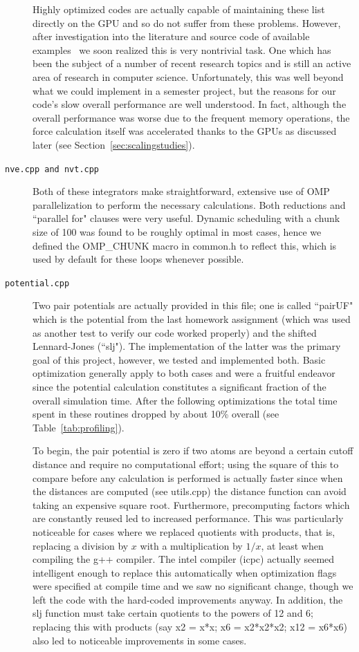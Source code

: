 \documentclass[12pt]{article}
\begin{document}
\begin{description}
Highly optimized codes are actually capable of maintaining these list directly on the GPU and so do not suffer from these problems.  However, after investigation into the literature and source code of available examples~\cite{Anderson2008, Lipscomb2012} we soon realized this is very nontrivial task. One which has been the subject of a number of recent research topics and is still an active area of research in computer science.  Unfortunately, this was well beyond what we could implement in a semester project, but the reasons for our code's slow overall performance are well understood.  In fact, although the overall performance was worse due to the frequent memory operations, the force calculation itself was accelerated thanks to the GPUs as discussed later (see Section~\ref{sec:scalingstudies}).

\item[\texttt{nve.cpp and nvt.cpp}] 
Both of these integrators make straightforward, extensive use of OMP parallelization to perform the necessary calculations.  Both reductions and ``parallel for" clauses were very useful.  Dynamic scheduling with a chunk size of 100 was found to be roughly optimal in most cases, hence we defined the OMP\_CHUNK macro in common.h to reflect this, which is used by default for these loops whenever possible.

\item[\texttt{potential.cpp}] 
Two pair potentials are actually provided in this file; one is called ``pairUF" which is the potential from the last homework assignment (which was used as another test to verify our code worked properly) and the shifted Lennard-Jones (``slj").  The implementation of the latter was the primary goal of this project, however, we tested and implemented both.  Basic optimization generally apply to both cases and were a fruitful endeavor since the potential calculation constitutes a significant fraction of the overall simulation time.  After the following optimizations the total time spent in these routines dropped by about 10\% overall (see Table~\ref{tab:profiling}).  

To begin, the pair potential is zero if two atoms are beyond a certain cutoff distance and require no computational effort; using the square of this to compare before any calculation is performed is actually faster since when the distances are computed (see utils.cpp) the distance function can avoid taking an expensive square root.  Furthermore, precomputing factors which are constantly reused led to increased performance.  This was particularly noticeable for cases where we replaced quotients with products, that is, replacing a division by $x$ with a multiplication by $1/x$, at least when compiling the g++ compiler.  The intel compiler (icpc) actually seemed intelligent enough to replace this automatically when optimization flags were specified at compile time and we saw no significant change, though we left the code with the hard-coded improvements anyway.  In addition, the slj function must take certain quotients to the powers of 12 and 6; replacing this with products (say x2 = x*x; x6 = x2*x2*x2; x12 = x6*x6) also led to noticeable improvements in some cases.


\end{description}
\end{document}

